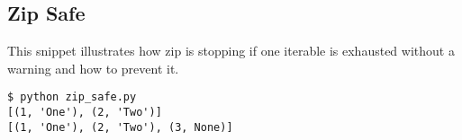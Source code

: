 \subsection{Zip Safe}

This snippet illustrates how zip is stopping if one iterable is exhausted without a warning and how to prevent it.



\begin{lstlisting}[caption=Output of zip\_safe.py]
$ python zip_safe.py
[(1, 'One'), (2, 'Two')]
[(1, 'One'), (2, 'Two'), (3, None)]
\end{lstlisting}

